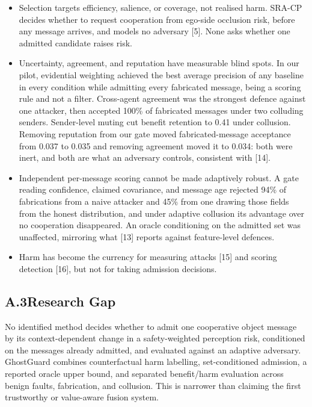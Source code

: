 \documentclass[11pt]{article}
\begin{document}
\begin{itemize}
  \item Selection targets efficiency, salience, or coverage, not realised harm.
    SRA-CP decides whether to request cooperation from ego-side occlusion risk,
    before any message arrives, and models no adversary [5]. None asks whether
    one admitted candidate raises risk.
  \item Uncertainty, agreement, and reputation have measurable blind spots. In
    our pilot, evidential weighting achieved the best average precision of any
    baseline in every condition while admitting every fabricated message, being
    a scoring rule and not a filter. Cross-agent agreement was the strongest
    defence against one attacker, then accepted 100\% of fabricated messages
    under two colluding senders. Sender-level muting cut benefit retention to
    0.41 under collusion. Removing reputation from our gate moved
    fabricated-message acceptance from 0.037 to 0.035 and removing agreement
    moved it to 0.034: both were inert, and both are what an adversary
    controls, consistent with [14].
  \item Independent per-message scoring cannot be made adaptively robust. A
    gate reading confidence, claimed covariance, and message age rejected 94\%
    of fabrications from a naive attacker and 45\% from one drawing those
    fields from the honest distribution, and under adaptive collusion its
    advantage over no cooperation disappeared. An oracle conditioning on the
    admitted set was unaffected, mirroring what [13] reports against
    feature-level defences.
  \item Harm has become the currency for measuring attacks [15] and scoring
    detection [16], but not for taking admission decisions.
\end{itemize}

\subsection{A.3\quad Research Gap}

No identified method decides whether to admit one cooperative object message by
its context-dependent change in a safety-weighted perception risk, conditioned
on the messages already admitted, and evaluated against an adaptive adversary.
GhostGuard combines counterfactual harm labelling, set-conditioned admission, a
reported oracle upper bound, and separated benefit/harm evaluation across
benign faults, fabrication, and collusion. This is narrower than claiming the
first trustworthy or value-aware fusion system.
\end{document}
